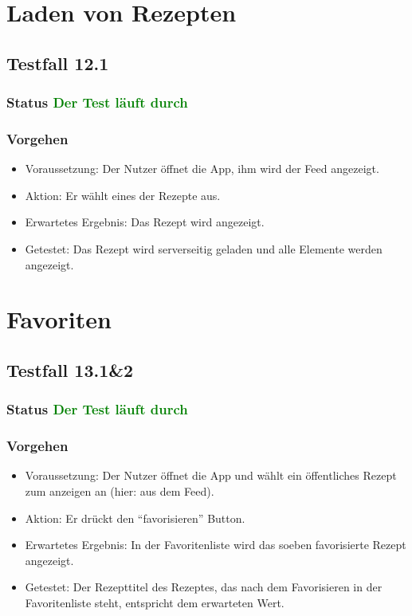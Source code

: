 \section{Laden von Rezepten}


\subsection{Testfall 12.1}
\subsubsection{Status \textcolor{green}{ Der Test läuft durch} }
\subsubsection{Vorgehen}
\begin{itemize}
\item Voraussetzung: Der Nutzer öffnet die App, ihm wird der Feed angezeigt. 
\item Aktion: Er wählt eines der Rezepte aus.
\item Erwartetes Ergebnis: Das Rezept wird angezeigt.
\item Getestet: Das Rezept wird serverseitig geladen und alle Elemente werden angezeigt.
\end{itemize}


\section{Favoriten}

\subsection{Testfall 13.1\&2}
\subsubsection{Status \textcolor{green}{ Der Test läuft durch} }
\subsubsection{Vorgehen}
\begin{itemize}
\item Voraussetzung: Der Nutzer öffnet die App und wählt ein öffentliches Rezept zum anzeigen an (hier: aus dem Feed).
\item Aktion:  Er drückt den "`favorisieren"' Button.
\item Erwartetes Ergebnis: In der Favoritenliste wird das soeben favorisierte Rezept angezeigt.
\item Getestet: Der Rezepttitel des Rezeptes, das nach dem Favorisieren in der Favoritenliste steht, entspricht dem erwarteten Wert.
\end{itemize}


